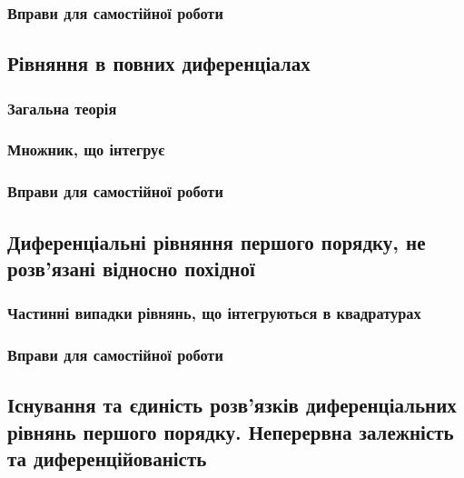 		\subsubsection{Вправи для самостійної роботи}
		

	\subsection{Рівняння в повних диференціалах}
	

		\subsubsection{Загальна теорія}
		

		\subsubsection{Множник, що інтегрує}
		

		\subsubsection{Вправи для самостійної роботи}
		

	\subsection{Диференціальні рівняння першого порядку, не розв'язані відносно похідної}
	

		\subsubsection{Частинні випадки рівнянь, що інтегруються в квадратурах}
		

		\subsubsection{Вправи для самостійної роботи}
		

	\subsection{Існування та єдиність розв'язків диференціальних рівнянь першого порядку. Неперервна залежність та диференційованість}
	

